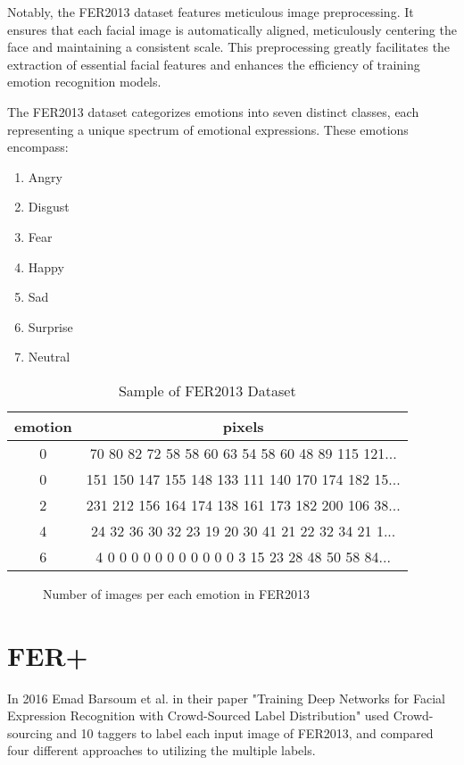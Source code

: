 \documentclass[]{report}
\begin{document}
Notably, the FER2013 dataset features meticulous image preprocessing. It ensures that each facial image is automatically aligned, meticulously centering the face and maintaining a consistent scale. This preprocessing greatly facilitates the extraction of essential facial features and enhances the efficiency of training emotion recognition models.

The FER2013 dataset categorizes emotions into seven distinct classes, each representing a unique spectrum of emotional expressions. These emotions encompass:


\begin{enumerate}
	\item Angry
	\item Disgust
	\item Fear
	\item Happy
	\item Sad
	\item Surprise
	\item Neutral
\end{enumerate}

\begin{table}
	\centering
	\caption{Sample of FER2013 Dataset}
	\begin{tabular}{| c | c |}
		
		\hline
		emotion &	pixels \\
		\hline
		0 &	70 80 82 72 58 58 60 63 54 58 60 48 89 115 121... \\ \hline
		0 &	151 150 147 155 148 133 111 140 170 174 182 15... \\ \hline
		2 &	231 212 156 164 174 138 161 173 182 200 106 38... \\ \hline
		4 &	24 32 36 30 32 23 19 20 30 41 21 22 32 34 21 1... \\ \hline
		6 &	4 0 0 0 0 0 0 0 0 0 0 0 3 15 23 28 48 50 58 84... \\ \hline
	\end{tabular}
\end{table}
\begin{figure}
	\centering
	
	\caption{Number of images per each emotion in FER2013}
\end{figure}
\section{FER+}
In 2016 Emad Barsoum et al. in their paper "Training Deep Networks for Facial Expression Recognition with Crowd-Sourced Label Distribution"\cite{barsoum2016training} used Crowd-sourcing and 10 taggers to label each input image of FER2013, and compared four different approaches to utilizing the multiple labels. 
\end{document}
